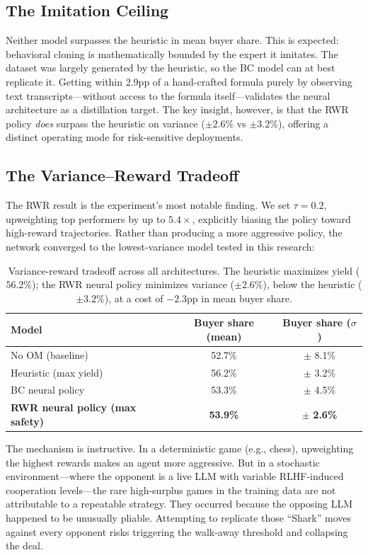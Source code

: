 \documentclass[11pt,a4paper]{article}
\begin{document}
\subsection{The Imitation Ceiling}

Neither model surpasses the heuristic in mean buyer share. This is expected: behavioral cloning is mathematically bounded by the expert it imitates. The dataset was largely generated by the heuristic, so the BC model can at best replicate it. Getting within 2.9pp of a hand-crafted formula purely by observing text transcripts---without access to the formula itself---validates the neural architecture as a distillation target. The key insight, however, is that the RWR policy \emph{does} surpass the heuristic on variance ($\pm 2.6\%$ vs $\pm 3.2\%$), offering a distinct operating mode for risk-sensitive deployments.

\subsection{The Variance--Reward Tradeoff}
\label{sec:vault}

The RWR result is the experiment's most notable finding. We set $\tau = 0.2$, upweighting top performers by up to $5.4\times$, explicitly biasing the policy toward high-reward trajectories. Rather than producing a more aggressive policy, the network converged to the lowest-variance model tested in this research:

\begin{table}[h]
\centering
\caption{Variance-reward tradeoff across all architectures. The heuristic maximizes yield ($56.2\%$); the RWR neural policy minimizes variance ($\pm 2.6\%$), below the heuristic ($\pm 3.2\%$), at a cost of $-2.3$pp in mean buyer share.}
\label{tab:vault}
\begin{tabular}{lcc}
\toprule
Model & Buyer share (mean) & Buyer share ($\sigma$) \\
\midrule
No OM (baseline) & 52.7\% & $\pm$ 8.1\% \\
Heuristic (max yield) & 56.2\% & $\pm$ 3.2\% \\
BC neural policy & 53.3\% & $\pm$ 4.5\% \\
\textbf{RWR neural policy (max safety)} & \textbf{53.9\%} & $\pm$ \textbf{2.6\%} \\
\bottomrule
\end{tabular}
\end{table}

The mechanism is instructive. In a deterministic game (e.g., chess), upweighting the highest rewards makes an agent more aggressive. But in a stochastic environment---where the opponent is a live LLM with variable RLHF-induced cooperation levels---the rare high-surplus games in the training data are not attributable to a repeatable strategy. They occurred because the opposing LLM happened to be unusually pliable. Attempting to replicate those ``Shark'' moves against every opponent risks triggering the walk-away threshold and collapsing the deal.
\end{document}
